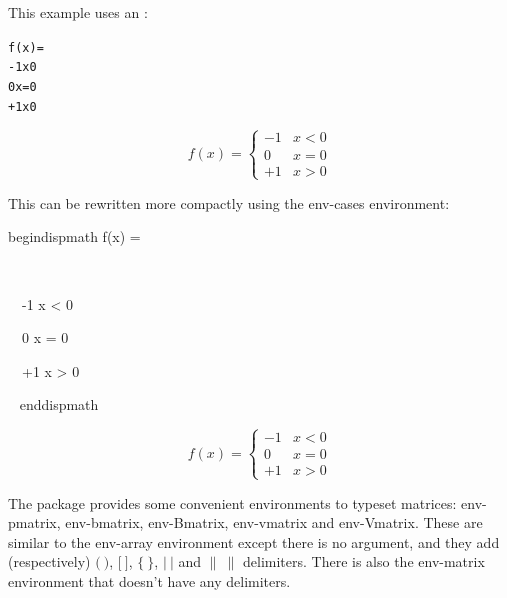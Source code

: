 This example uses an 
:
\begin{code}
\begin{alltt}
f(x) = 
   -1  x  0
   0   x = 0
   +1  x  0
\end{alltt}
\end{code}%
\begin{resultS}
\[
f(x) = 
\left\{
\begin{array}{rl}
-1 & x < 0\\
0 & x = 0\\
+1 & x > 0
\end{array}
\right.
\]
\end{resultS}
This can be rewritten more compactly using the 
\gls{env-cases} environment:
\begin{code}
\gls{begindispmath}\newline
f(x) = \newline
\strut~\newline
\strut~~-1  x < 0\newline
\strut~~0   x = 0\newline
\strut~~+1  x > 0\newline
\strut~\newline
\gls{enddispmath}
\end{code}
\begin{resultS}
\[
f(x) = 
\begin{cases}
-1 & x < 0\\
0 & x = 0\\
+1 & x > 0
\end{cases}
\]
\end{resultS}

The  package provides some convenient environments to
typeset matrices: \gls{env-pmatrix}, \gls{env-bmatrix},
\gls{env-Bmatrix}, \gls{env-vmatrix} and \gls{env-Vmatrix}. These
are similar to the \gls{env-array} environment except there is no
argument, and they add (respectively) $\bigl(~\bigr)$,
$\bigl[~\bigr]$, $\bigl\{~\bigr\}$, $\bigl\lvert~\bigr\rvert$ and
$\bigl\lVert~\bigr\rVert$ delimiters. There is also the
\gls{env-matrix} environment that doesn't have any delimiters.

